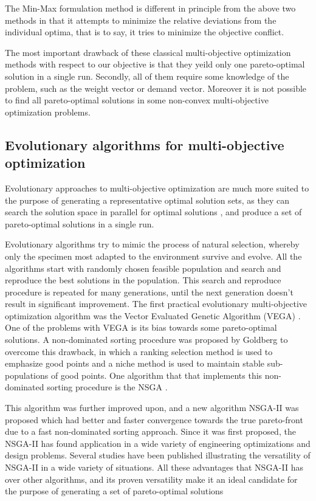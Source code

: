 The Min-Max formulation method is different in principle from the 
above two methods in that it attempts to minimize the relative 
deviations from the individual optima, that is to say, it tries to 
minimize the objective conflict.

The most important drawback of these classical multi-objective 
optimization methods with respect to our objective is that they yeild
only one pareto-optimal solution in a single run. Secondly, all of 
them require some knowledge of the problem, such as the weight vector
or demand vector. Moreover it is not possible to find all 
pareto-optimal solutions in some non-convex multi-objective optimization
problems.

\subsection{Evolutionary algorithms for multi-objective optimization}
Evolutionary approaches to multi-objective optimization are much more
suited to the purpose of generating a representative optimal solution 
sets, as they can search the solution space in parallel for optimal 
solutions , and produce a set of pareto-optimal solutions in a
single run. 

Evolutionary algorithms try to mimic the process of natural selection,
whereby only the specimen most adapted to the environment survive and
evolve. All the algorithms start with randomly chosen feasible 
population and search and reproduce the best solutions in the 
population. This search and reproduce procedure is repeated for
many generations, until the next generation doesn't result in 
significant improvement. The first practical evolutionary 
multi-objective optimization algorithm was the Vector Evaluated 
Genetic Algorithm (VEGA) \cite{schaffer1985}. One of the problems with
VEGA is its bias towards some pareto-optimal solutions. A 
non-dominated sorting procedure was proposed by Goldberg to overcome 
this drawback, in which a ranking selection method is used to 
emphasize good points and a niche method is used to maintain stable 
sub-populations of good points. One algorithm that that implements 
this non-dominated sorting procedure is the NSGA 
\cite{deb1994}.

This algorithm was further improved upon, and a new algorithm 
NSGA-II \cite{deb2002} was proposed which had better and faster 
convergence towards the true pareto-front due to a fast non-dominated
sorting approach. Since it was first proposed, the NSGA-II has found
application in a wide variety of engineering optimizations and design 
problems. Several studies have been published illustrating the 
versatility of NSGA-II in a wide variety of situations. All these 
advantages that NSGA-II has over other algorithms, and its proven
versatility make it an ideal candidate for the purpose of generating 
a set of pareto-optimal solutions 

